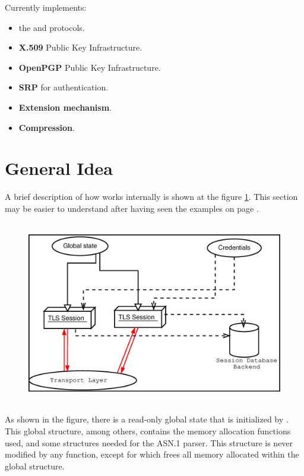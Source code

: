 Currently \gnutls{} implements:
\begin{itemize}
\item the \tlsI{} and \sslIII{} protocols.
\item {\bf X.509} Public Key Infrastructure.
\item {\bf OpenPGP} Public Key Infrastructure.
\item {\bf SRP} for \tls{} authentication.
\item \tls{} {\bf Extension mechanism}.
\item \tls{} {\bf Compression}.
\end{itemize}


\section{General Idea}
A brief description of how \gnutls{} works internally is shown at
the figure \ref{fig:internals}. This section may be easier to understand
after having seen the examples on page \pageref{examples}.

\begin{figure}[htp]
\includegraphics[height=8cm,width=12cm]{internals}
\label{fig:internals}
\end{figure}

\par
As shown in the figure, there is a read-only global state that
is initialized by .
This global structure, among others, contains the memory allocation
functions used, and some structures needed for the ASN.1 parser.
This structure is never modified by any \gnutls{} function, except
for  which frees
all memory allocated within the global structure.

